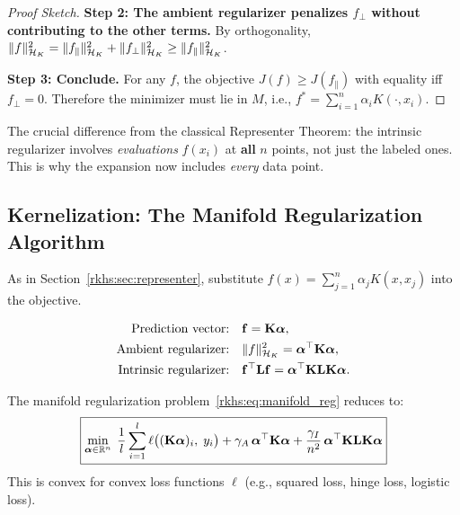 \begin{notechapter}
\begin{proof}[Proof Sketch]
\textbf{Step 2: The ambient regularizer penalizes $f_\perp$ without 
contributing to the other terms.}
By orthogonality, $\| f \|_{\mathcal{H}_K}^2 = \| f_\parallel \|_{\mathcal{H}_K}^2 
+ \| f_\perp \|_{\mathcal{H}_K}^2 \geq \| f_\parallel \|_{\mathcal{H}_K}^2$.

\textbf{Step 3: Conclude.}
For any $f$, the objective $J(f) \geq J(f_\parallel)$ with equality 
iff $f_\perp = 0$. Therefore the minimizer must lie in $M$, i.e., 
$f^* = \sum_{i=1}^n \alpha_i K(\cdot, x_i)$.
\end{proof}

\begin{remark}
The crucial difference from the classical Representer Theorem: the 
intrinsic regularizer involves \emph{evaluations} $f(x_i)$ at 
\textbf{all} $n$ points, not just the labeled ones. This is why the 
expansion now includes \emph{every} data point.
\end{remark}

\subsection{Kernelization: The Manifold Regularization Algorithm}
\label{rkhs:subsec:manifold_kernelization}

As in Section~\ref{rkhs:sec:representer}, substitute 
$f(x) = \sum_{j=1}^n \alpha_j K(x, x_j)$ into the objective.

\begin{align*}
\text{Prediction vector:} &\quad \mathbf{f} = \mathbf{K} \boldsymbol{\alpha}, \\
\text{Ambient regularizer:} &\quad \| f \|_{\mathcal{H}_K}^2 
  = \boldsymbol{\alpha}^\top \mathbf{K} \boldsymbol{\alpha}, \\
\text{Intrinsic regularizer:} &\quad \mathbf{f}^\top \mathbf{L} \mathbf{f} 
  = \boldsymbol{\alpha}^\top \mathbf{K} \mathbf{L} \mathbf{K} \boldsymbol{\alpha}.
\end{align*}

\begin{theorembox}
\label{rkhs:thm:manifold_kernelized}
The manifold regularization problem~\eqref{rkhs:eq:manifold_reg} reduces to:
\begin{equation}
\label{rkhs:eq:manifold_kernelized}
\boxed{\min_{\boldsymbol{\alpha} \in \mathbb{R}^n}\; 
\frac{1}{l}\sum_{i=1}^{l} \ell\bigl((\mathbf{K}\boldsymbol{\alpha})_i,\; y_i\bigr) 
+ \gamma_A\,\boldsymbol{\alpha}^\top\mathbf{K}\boldsymbol{\alpha} 
+ \frac{\gamma_I}{n^2}\,\boldsymbol{\alpha}^\top \mathbf{K}\mathbf{L}\mathbf{K}\boldsymbol{\alpha}}
\end{equation}
This is convex for convex loss functions $\ell$ (e.g., squared loss, 
hinge loss, logistic loss).
\end{theorembox}


\end{notechapter}
